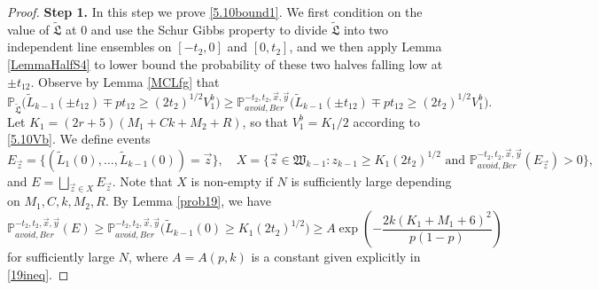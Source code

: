 \begin{proof}
	\noindent\textbf{Step 1.} In this step we prove \eqref{5.10bound1}. We first condition on the value of $\tilde{\mathfrak{L}}$ at 0 and use the Schur Gibbs property to divide $\tilde{\mathfrak{L}}$ into two independent line ensembles on $[-t_2,0]$ and $[0,t_2]$, and we then apply Lemma \ref{LemmaHalfS4} to lower bound the probability of these two halves falling low at $\pm t_{12}$. Observe by Lemma \ref{MCLfg} that
	\[
	\mathbb{P}_{\tilde{\mathfrak{L}}}\Big(\tilde{L}_{k-1}(\pm t_{12}) \mp pt_{12} \geq (2t_2)^{1/2}V_1^b\Big) \geq \mathbb{P}^{-t_2,t_2,\vec{x},\vec{y}}_{avoid, Ber}\Big(\tilde{L}_{k-1}(\pm t_{12}) \mp pt_{12} \geq (2t_2)^{1/2}V_1^b\Big).
	\]
	Let $K_1 = (2r+5)(M_1+Ck+M_2+R)$, so that $V_1^b = K_1/2$ according to \eqref{5.10Vb}. We define events
	\[
	E_{\vec{z}} = \big\{(\tilde{L}_1(0),\dots,\tilde{L}_{k-1}(0)) = \vec{z}\big\}, \quad X = \Big\{ \vec{z}\in\mathfrak{W}_{k-1} : z_{k-1} \geq K_1(2t_2)^{1/2} \mbox { and } \mathbb{P}^{-t_2,t_2,\vec{x},\vec{y}}_{avoid,Ber}(E_{\vec{z}}) > 0\Big\},
	\]
	and $E = \bigsqcup_{\vec{z} \in X} E_{\vec{z}}$. Note that $X$ is non-empty if $N$ is sufficiently large depending on $M_1,C,k,M_2,R$. By Lemma \ref{prob19}, we have
	\begin{equation}\label{5.10Ebound}
	\mathbb{P}^{-t_2,t_2,\vec{x},\vec{y}}_{avoid, Ber}(E) \geq \mathbb{P}^{-t_2,t_2,\vec{x},\vec{y}}_{avoid,Ber}\Big(\tilde{L}_{k-1}(0) \geq K_1(2t_2)^{1/2}\Big) \geq A\exp\left(-\frac{2k(K_1+M_1+6)^2}{p(1-p)}\right)
	\end{equation}
	for sufficiently large $N$, where $A = A(p,k)$ is a constant given explicitly in \eqref{19ineq}.
	

\end{proof}
